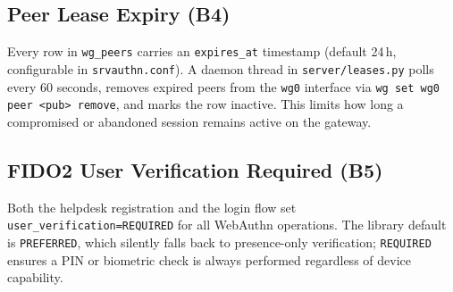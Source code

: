 \subsection{Peer Lease Expiry (B4)}
Every row in \texttt{wg\_peers} carries an \texttt{expires\_at} timestamp
(default 24\,h, configurable in \texttt{srvauthn.conf}).
A daemon thread in \texttt{server/leases.py} polls every 60 seconds, removes
expired peers from the \texttt{wg0} interface via \texttt{wg set wg0 peer
<pub> remove}, and marks the row inactive.
This limits how long a compromised or abandoned session remains active on
the gateway.

\subsection{FIDO2 User Verification Required (B5)}
Both the helpdesk registration and the login flow set
\texttt{user\_verification=REQUIRED} for all WebAuthn operations.
The library default is \texttt{PREFERRED}, which silently falls back to
presence-only verification; \texttt{REQUIRED} ensures a PIN or biometric
check is always performed regardless of device capability.
